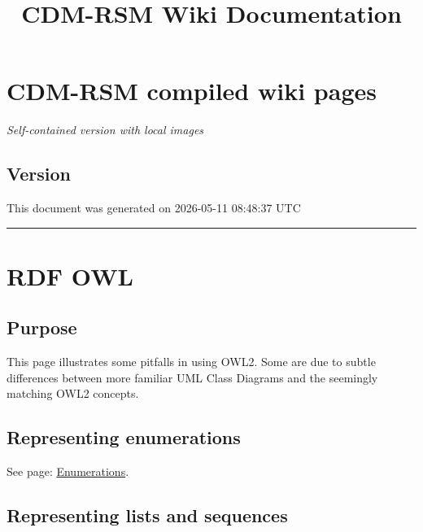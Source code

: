 \documentclass[
  11pt,
]{article}
\title{CDM-RSM Wiki Documentation}
\author{}
\date{}
\begin{document}
\maketitle

{
\hypersetup{linkcolor=}
\setcounter{tocdepth}{3}
\tableofcontents
}
\hypertarget{cdm-rsm-compiled-wiki-pages}{%
\section{CDM-RSM compiled wiki
pages}\label{cdm-rsm-compiled-wiki-pages}}

\emph{Self-contained version with local images}

\hypertarget{version}{%
\subsection{Version}\label{version}}

This document was generated on 2026-05-11 08:48:37 UTC

\begin{center}\rule{0.5\linewidth}{0.5pt}\end{center}

\hypertarget{rdf-owl}{%
\section{RDF OWL}\label{rdf-owl}}

\hypertarget{purpose}{%
\subsection{Purpose}\label{purpose}}

This page illustrates some pitfalls in using OWL2. Some are due to
subtle differences between more familiar UML Class Diagrams and the
seemingly matching OWL2 concepts.

\hypertarget{representing-enumerations}{%
\subsection{Representing enumerations}\label{representing-enumerations}}

See page:
\href{https://github.com/UICrail/SemanticRSM/wiki/Enumerations}{Enumerations}.

\hypertarget{representing-lists-and-sequences}{%
\subsection{Representing lists and
sequences}\label{representing-lists-and-sequences}}
\end{document}
